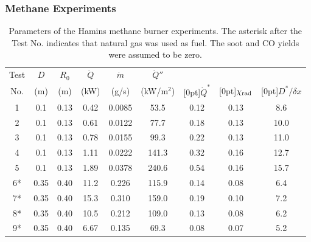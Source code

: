 \newpage

\subsubsection{Methane Experiments}

\begin{table}[!ht]
\centering
\caption[Parameters of the Hamins methane burner experiments]{Parameters of the Hamins methane burner experiments. The asterisk after the Test No. indicates that natural gas was used as fuel. The soot and CO yields were assumed to be zero.}
\begin{tabular}{|c|c|c|c|c|c|c||c|c|}
\hline
Test      & $D$      & $R_0$      & $\dot{Q}$   &  $\dot{m}$            &  $\dot{Q}''$   &               &            &          \\
No.       & (m)      & (m)        & (kW)        &  (g/s)                &  (kW/m$^2$)    & \raisebox{1.5ex}[0pt]{$\dot{Q}^*$} & \raisebox{1.5ex}[0pt]{$\chi_{\rm rad}$} & \raisebox{1.5ex}[0pt]{$D^*/\delta x$} \\ \hline \hline
1         & 0.1      & 0.13       & 0.42        &  0.0085               &  53.5          & 0.12          & 0.13       & 8.6     \\ \hline
2         & 0.1      & 0.13       & 0.61        &  0.0122               &  77.7          & 0.18          & 0.13       & 10.0     \\ \hline
3         & 0.1      & 0.13       & 0.78        &  0.0155               &  99.3          & 0.22          & 0.13       & 11.0     \\ \hline
4         & 0.1      & 0.13       & 1.11        &  0.0222               &  141.3         & 0.32          & 0.16       & 12.7      \\ \hline
5         & 0.1      & 0.13       & 1.89        &  0.0378               &  240.6         & 0.54          & 0.16       & 15.7      \\ \hline
6*        & 0.35     & 0.40       & 11.2        &  0.226                &  115.9         & 0.14          & 0.08       & 6.4      \\ \hline
7*        & 0.35     & 0.40       & 15.3        &  0.310                &  159.0         & 0.19          & 0.10       & 7.2      \\ \hline
8*        & 0.35     & 0.40       & 10.5        &  0.212                &  109.0         & 0.13          & 0.08       & 6.2      \\ \hline
9*        & 0.35     & 0.40       & 6.67        &  0.135                &  69.3          & 0.08          & 0.07       & 5.2      \\ \hline

\end{tabular}
\end{table}

